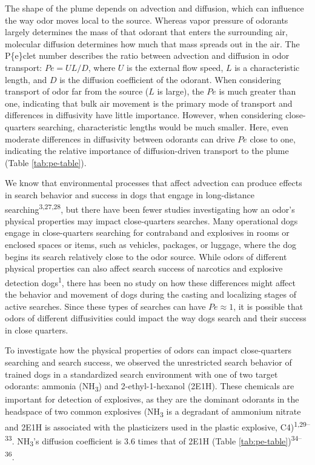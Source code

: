 \documentclass[
]{article}
\begin{document}
The shape of the plume depends on advection and diffusion, which can influence the way odor moves local to the source. Whereas vapor pressure of odorants largely determines the mass of that odorant that enters the surrounding air, molecular diffusion determines how much that mass spreads out in the air. The P\textquotesingle\{e\}clet number describes the ratio between advection and diffusion in odor transport: \(Pe = UL/D\), where \(U\) is the external flow speed, \(L\) is a characteristic length, and \(D\) is the diffusion coefficient of the odorant. When considering transport of odor far from the source (\(L\) is large), the \(Pe\) is much greater than one, indicating that bulk air movement is the primary mode of transport and differences in diffusivity have little importance. However, when considering close-quarters searching, characteristic lengths would be much smaller. Here, even moderate differences in diffusivity between odorants can drive \(Pe\) close to one, indicating the relative importance of diffusion-driven transport to the plume (Table \ref{tab:pe-table}).

We know that environmental processes that affect advection can produce effects in search behavior and success in dogs that engage in long-distance searching\textsuperscript{3,27,28}, but there have been fewer studies investigating how an odor's physical properties may impact close-quarters searches. Many operational dogs engage in close-quarters searching for contraband and explosives in rooms or enclosed spaces or items, such as vehicles, packages, or luggage, where the dog begins its search relatively close to the odor source. While odors of different physical properties can also affect search success of narcotics and explosive detection dogs\textsuperscript{1}, there has been no study on how these differences might affect the behavior and movement of dogs during the casting and localizing stages of active searches. Since these types of searches can have \(Pe \approx 1\), it is possible that odors of different diffusivities could impact the way dogs search and their success in close quarters.

To investigate how the physical properties of odors can impact close-quarters searching and search success, we observed the unrestricted search behavior of trained dogs in a standardized search environment with one of two target odorants: ammonia (NH\textsubscript{3}) and 2-ethyl-1-hexanol (2E1H). These chemicals are important for detection of explosives, as they are the dominant odorants in the headspace of two common explosives (NH\textsubscript{3} is a degradant of ammonium nitrate and 2E1H is associated with the plasticizers used in the plastic explosive, C4)\textsuperscript{1,29--33}. NH\textsubscript{3}'s diffusion coefficient is 3.6 times that of 2E1H (Table \ref{tab:pe-table})\textsuperscript{34--36}.
\end{document}
